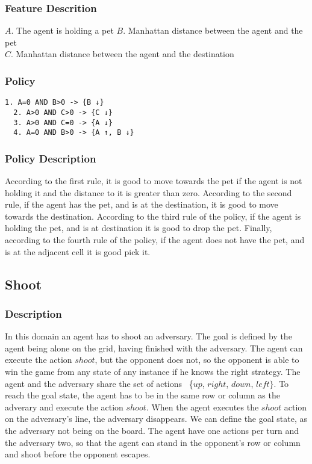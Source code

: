 \documentclass[a4paper]{article}
\begin{document}
\subsubsection{Feature Descrition}
$A$. The agent is holding a pet
$B$. Manhattan distance between the agent and the pet\\
$C$. Manhattan distance between the agent and the destination

\subsubsection{Policy}
\begin{Verbatim}[fontsize=\footnotesize]
  1. A=0 AND B>0 -> {B ↓}
  2. A>0 AND C>0 -> {C ↓}
  3. A>0 AND C=0 -> {A ↓}
  4. A=0 AND B>0 -> {A ↑, B ↓}
\end{Verbatim}

\subsubsection{Policy Description}
According to the first rule, it is good to move towards the pet if the agent is not holding it and the distance to it is greater than zero. According to the second rule, if the agent has the pet, and is at the destination, it is good to move towards the destination. According to the third rule of the policy, if the agent is holding the pet, and is at destination it is good to drop the pet. Finally, according to the fourth rule of the policy, if the agent does not have the pet, and is at the adjacent cell it is good pick it.

\subsection{Shoot}
\subsubsection{Description}
In this domain an agent has to shoot an adversary. The goal is defined by the agent being alone on the grid, having finished with the adversary. The agent can execute the action $shoot$, but the opponent does not, so the opponent is able to win the game from any state of any instance if he knows the right strategy. The agent and the adversary share the set of actions ~\{$up$, $right$, $down$, $left\}$. To reach the goal state, the agent has to be in the same row or column as the adverary and execute the action $shoot$. When the agent executes the $shoot$ action on the adversary's line, the adversary disappears. We can define the goal state, as the adversary not being on the board. The agent have one actions per turn and the adversary two, so that the agent can stand in the opponent's row or column and shoot before the opponent escapes.
\end{document}

